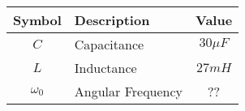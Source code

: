 
    \begin{tabular}{|c|l|c|}
        \hline
        \textbf{Symbol} & \textbf{Description} & \textbf{Value} \\
        \hline
        \(C\) & Capacitance & \(30 \mu F\) \\
        \(L\) & Inductance & \(27 mH\) \\
        \(\omega_0\) & Angular Frequency & ??\\
        \hline
    \end{tabular}
